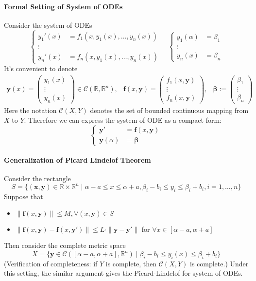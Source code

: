 \paragraph{Formal Setting of System of ODEs}
Consider the system of ODEs
\[
\left\{
\begin{aligned}
y_1'(x)&=f_1(x,y_1(x),\dots,y_n(x))\\
\vdots\\
y_n'(x)&=f_n(x,y_1(x),\dots,y_n(x))
\end{aligned}
\right.\quad
\left\{
\begin{aligned}
y_1(\alpha)&=\beta_1\\
\vdots\\
y_n(x)&=\beta_n
\end{aligned}
\right.
\]
It's convenient to denote
\[
\begin{array}{lll}
\bm y(x)=\begin{pmatrix}
y_1(x)\\\vdots\\y_n(x)
\end{pmatrix}\in\mathcal{C}(\mathbb{R},\mathbb{R}^n),
&
\bm f(x,\bm y)=\begin{pmatrix}
f_1(x,\bm y)\\
\vdots\\
f_n(x,\bm y)
\end{pmatrix},
&
\bm\beta:=\begin{pmatrix}
\beta_1\\\vdots\\\beta_n
\end{pmatrix}
\end{array}
\]
Here the notation $\mathcal{C}(X,Y)$ denotes the set of bounded continuous mapping from $X$ to $Y$. Therefore we can express the system of ODE as a compact form:
\[
\left\{
\begin{aligned}
\bm y'&=\bm f(x,\bm y)\\
\bm y(\alpha)&=\bm\beta
\end{aligned}
\right.
\]
\paragraph{Generalization of Picard Lindelof Theorem}
Consider the rectangle
\[
S = \{(\bm x,\bm y)\in\mathbb{R}\times\mathbb{R}^n\mid \alpha-a\le x\le\alpha+a,\beta_i-b_i\le y_i\le \beta_i+b_i, i=1,\dots,n\}
\]
Suppose that 
\begin{itemize}
\item
$\|\bm f(x,\bm y)\|\le M, \forall (x,\bm y)\in S$
\item
$\|\bm f(x,\bm y) - \bm f(x,\bm y')\|\le L\cdot\|\bm y-\bm y'\|$ for $\forall x\in[\alpha-a,\alpha+a]$
\end{itemize}
Then consider the complete metric space
\[
X=\{\bm y\in \mathcal{C}([\alpha-a,\alpha+a],\mathbb{R}^n)\mid \beta_i - b_i\le y_i(x)\le\beta_i + b_i\}
\]
(Verification of completeness: if $Y$ is complete, then $\mathcal{C}(X,Y)$ is complete.) 
Under this setting, the similar argument gives the Picard-Lindelof for system of ODEs.



